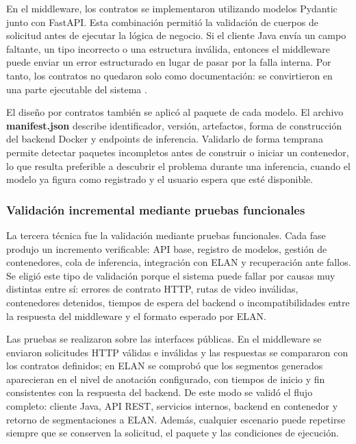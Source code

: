 En el middleware, los contratos se implementaron utilizando modelos Pydantic junto con FastAPI. Esta combinación permitió la validación de cuerpos de solicitud antes de ejecutar la lógica de negocio. Si el cliente Java envía un campo faltante, un tipo incorrecto o una estructura inválida, entonces el middleware puede enviar un error estructurado en lugar de pasar por la falla interna. Por tanto, los contratos no quedaron solo como documentación: se convirtieron en una parte ejecutable del sistema \cite{pydantic2026models,fastapi2026features}.

El diseño por contratos también se aplicó al paquete de cada modelo. El archivo \textbf{manifest.json} describe identificador, versión, artefactos, forma de construcción del backend Docker y endpoints de inferencia. Validarlo de forma temprana permite detectar paquetes incompletos antes de construir o iniciar un contenedor, lo que resulta preferible a descubrir el problema durante una inferencia, cuando el modelo ya figura como registrado y el usuario espera que esté disponible.

\subsubsection{Validación incremental mediante pruebas funcionales}

La tercera técnica fue la validación mediante pruebas funcionales. Cada fase produjo un incremento verificable: API base, registro de modelos, gestión de contenedores, cola de inferencia, integración con ELAN y recuperación ante fallos. Se eligió este tipo de validación porque el sistema puede fallar por causas muy distintas entre sí: errores de contrato HTTP, rutas de video inválidas, contenedores detenidos, tiempos de espera del backend o incompatibilidades entre la respuesta del middleware y el formato esperado por ELAN.

Las pruebas se realizaron sobre las interfaces públicas. En el middleware se enviaron solicitudes HTTP válidas e inválidas y las respuestas se compararon con los contratos definidos; en ELAN se comprobó que los segmentos generados aparecieran en el nivel de anotación configurado, con tiempos de inicio y fin consistentes con la respuesta del backend. De este modo se validó el flujo completo: cliente Java, API REST, servicios internos, backend en contenedor y retorno de segmentaciones a ELAN. Además, cualquier escenario puede repetirse siempre que se conserven la solicitud, el paquete y las condiciones de ejecución.

